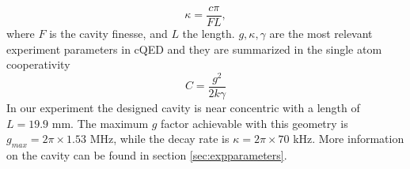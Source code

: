 \begin{equation}
\kappa =\frac{c\pi}{FL},
\end{equation}
where $F$ is the cavity finesse, and $L$ the length. $g,\kappa,\gamma$ are the most relevant experiment parameters in cQED and they are summarized in the single atom cooperativity
\begin{equation}
C = \frac{g^2}{2k\gamma}
\end{equation}
In our experiment the designed cavity is near concentric with a length of $L = 19.9$ mm. The maximum $g$ factor achievable with this geometry is $g_{max} = 2\pi \times 1.53$ MHz, while the decay rate is $\kappa = 2\pi\times 70$ kHz. More information on the cavity can be found in section \ref{sec:expparameters}.%
